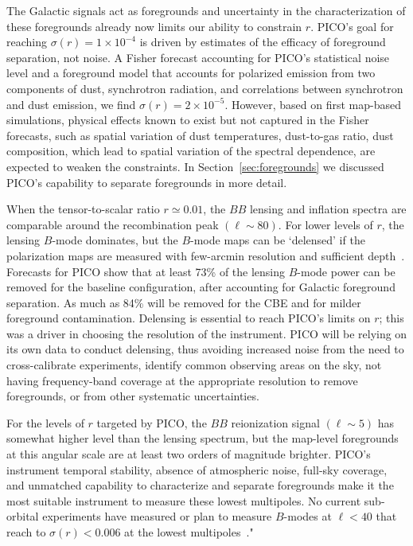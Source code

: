 \documentclass[PICOReport.tex]{subfiles}
\begin{document}
The Galactic signals act as foregrounds and uncertainty in the characterization of these foregrounds already now limits our ability to constrain $r$. PICO's goal for reaching $\sigma(r) = 1\times10^{-4}$ is driven by estimates of the efficacy of foreground separation, not noise.  A Fisher forecast accounting for PICO's statistical noise level and a foreground model that accounts for polarized emission from two components of dust, synchrotron radiation, and correlations between synchrotron and dust emission, we find $\sigma(r) = 2\times10^{-5}$. However, based on first map-based simulations, physical effects known to exist but not captured in the Fisher forecasts, such as spatial variation of dust temperatures, dust-to-gas ratio, dust composition, which lead to spatial variation of the spectral dependence, are expected to weaken the constraints. In Section~\ref{sec:foregrounds} we discussed PICO's capability to separate foregrounds in more detail. 

When the tensor-to-scalar ratio $r \simeq 0.01$, the $BB$ lensing and inflation spectra are comparable around the recombination peak $(\ell \sim 80)$. For lower levels of $r$, the lensing $B$-mode dominates, but the $B$-mode maps can be `delensed' if the polarization maps are measured with few-arcmin resolution and sufficient depth~\citep{2004PhRvD..69d3005S,2012JCAP...06..014S}. Forecasts for PICO show that at least 73\% of the lensing $B$-mode power can be removed for the baseline configuration, after accounting for Galactic foreground separation. As much as 84\% will be removed for the CBE and for milder foreground contamination. Delensing is essential to reach PICO's limits on $r$; this was a driver in choosing the resolution of the instrument.  PICO will be relying on its own data to conduct delensing, thus avoiding increased noise from the need to cross-calibrate experiments, identify common observing areas on the sky, not having frequency-band coverage at the appropriate resolution to remove foregrounds, or from other systematic uncertainties.

For the levels of $r$ targeted by PICO, the $BB$ reionization signal $(\ell \sim 5)$ has somewhat higher level than the lensing spectrum, but the map-level foregrounds at this angular scale are at least two orders of magnitude brighter.  PICO's instrument temporal stability, absence of atmospheric noise, full-sky coverage, and unmatched capability to characterize and separate foregrounds make it the most suitable instrument to measure these lowest multipoles. No current sub-orbital experiments have measured or plan to measure $B$-modes at $\ell<40$ that reach to $\sigma(r) < 0.006$ at the lowest multipoles~\citep{class}."
\end{document}
